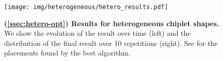 \begin{figure}[h]
\centering
\captionsetup{justification=centering}
\vspace{-0.5em}
\texttt{[image: img/heterogeneous/hetero\_results.pdf]}
%
\caption{\textbf{(\textsection \ref{ssec:hetero-opt}) Results for heterogeneous chiplet shapes.}
We show the evolution of the result over time (left) and the distribution of the final result over 10 repetitions (right).
See  for the placements found by the best algorithm.}
\label{fig:hetero-results}
\vspace{-1em}
\end{figure}
